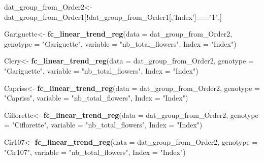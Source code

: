 \documentclass[]{article}
\newenvironment{Shaded}{\begin{snugshade}}{\end{snugshade}}
\newcommand{\KeywordTok}[1]{\textcolor[rgb]{0.13,0.29,0.53}{\textbf{#1}}}
\newcommand{\DataTypeTok}[1]{\textcolor[rgb]{0.13,0.29,0.53}{#1}}
\newcommand{\StringTok}[1]{\textcolor[rgb]{0.31,0.60,0.02}{#1}}
\newcommand{\OperatorTok}[1]{\textcolor[rgb]{0.81,0.36,0.00}{\textbf{#1}}}
\newcommand{\NormalTok}[1]{#1}
\begin{document}
\begin{Shaded}
\begin{Highlighting}[]
\NormalTok{dat_group_from_Order2<-dat_group_from_Order1[}\OperatorTok{!}\NormalTok{dat_group_from_Order1[,}\StringTok{'Index'}\NormalTok{]}\OperatorTok{==}\StringTok{"1"}\NormalTok{,]}

\NormalTok{Gariguette<-}\StringTok{ }\KeywordTok{fc_linear_trend_reg}\NormalTok{(}\DataTypeTok{data =}\NormalTok{ dat_group_from_Order2,}
                                 \DataTypeTok{genotype =} \StringTok{"Gariguette"}\NormalTok{,}
                                 \DataTypeTok{variable =} \StringTok{"nb_total_flowers"}\NormalTok{,}
                                 \DataTypeTok{Index =} \StringTok{"Index"}\NormalTok{)}

\NormalTok{Clery<-}\StringTok{ }\KeywordTok{fc_linear_trend_reg}\NormalTok{(}\DataTypeTok{data =}\NormalTok{ dat_group_from_Order2,}
                            \DataTypeTok{genotype =} \StringTok{"Gariguette"}\NormalTok{,}
                            \DataTypeTok{variable =} \StringTok{"nb_total_flowers"}\NormalTok{,}
                            \DataTypeTok{Index =} \StringTok{"Index"}\NormalTok{)}

\NormalTok{Capriss<-}\StringTok{ }\KeywordTok{fc_linear_trend_reg}\NormalTok{(}\DataTypeTok{data =}\NormalTok{ dat_group_from_Order2,}
                              \DataTypeTok{genotype =} \StringTok{"Capriss"}\NormalTok{,}
                              \DataTypeTok{variable =} \StringTok{"nb_total_flowers"}\NormalTok{,}
                              \DataTypeTok{Index =} \StringTok{"Index"}\NormalTok{)}

\NormalTok{Ciflorette<-}\StringTok{ }\KeywordTok{fc_linear_trend_reg}\NormalTok{(}\DataTypeTok{data =}\NormalTok{ dat_group_from_Order2,}
                                 \DataTypeTok{genotype =} \StringTok{"Ciflorette"}\NormalTok{,}
                                 \DataTypeTok{variable =} \StringTok{"nb_total_flowers"}\NormalTok{,}
                                 \DataTypeTok{Index =} \StringTok{"Index"}\NormalTok{)}

\NormalTok{Cir107<-}\StringTok{ }\KeywordTok{fc_linear_trend_reg}\NormalTok{(}\DataTypeTok{data =}\NormalTok{ dat_group_from_Order2,}
                             \DataTypeTok{genotype =} \StringTok{"Cir107"}\NormalTok{,}
                             \DataTypeTok{variable =} \StringTok{"nb_total_flowers"}\NormalTok{,}
                             \DataTypeTok{Index =} \StringTok{"Index"}\NormalTok{)}


\end{Highlighting}
\end{Shaded}
\end{document}
